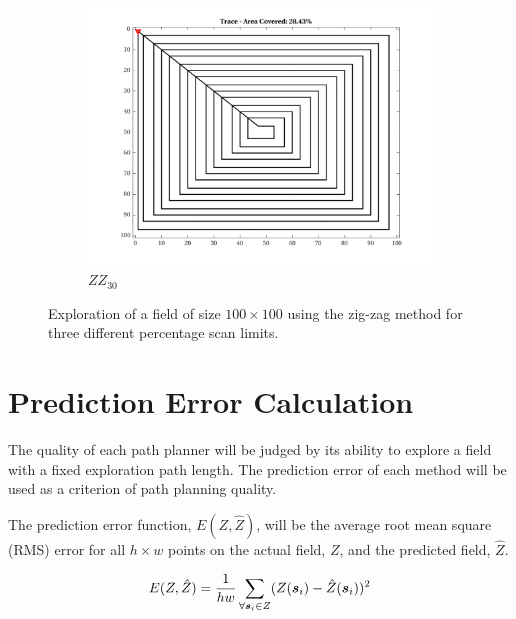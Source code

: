 \begin{figure}[htb!]
\begin{subfigure}[t]{0.3333\textwidth}
    \end{subfigure}%
    \begin{subfigure}[t]{0.3333\textwidth}
        \centering
        \includegraphics[width=\linewidth]{figures/hbresults/path_zz_30p_100x100_sf_100_seed_2.png}
        \ssp
        \captionsetup{skip=0.20\baselineskip,size=footnotesize}
        \caption{$ZZ_{30}$}
    \end{subfigure}%
    \ssp
    \captionsetup{skip=0.20\baselineskip}
    \caption{Exploration of a field of size $100 \times 100$ using the zig-zag method for three different percentage scan limits.}
    \label{fig:zz102030}
\end{figure}

\section{Prediction Error Calculation}
The quality of each path planner will be judged by its ability to explore a field with a fixed exploration path length. The prediction error of each method will be used as a criterion of path planning quality.

The prediction error function, $E (Z,\hat{Z})$, will be the average root mean square (RMS) error for all $h \times w$ points on the actual field, $Z$, and the predicted field, $\hat{Z}$.

\begin{equation}
E (Z, \hat{Z}) = \frac{1}{hw}\sum_{\forall {\it{\boldsymbol{s}}}_i \in Z} (Z({\it{\boldsymbol{s}}}_i) - \hat{Z}({\it{\boldsymbol{s}}}_i))^2
\end{equation}



